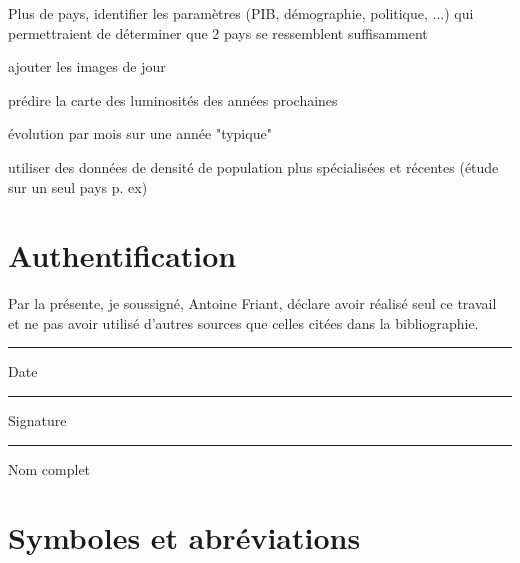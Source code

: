 \documentclass[a4paper, 11pt]{report}
\begin{document}
Plus de pays, identifier les paramètres (PIB, démographie, politique, ...) qui permettraient de déterminer que 2 pays se ressemblent suffisamment

ajouter les images de jour

prédire la carte des luminosités des années prochaines

évolution par mois sur une année "typique"

utiliser des données de densité de population plus spécialisées et récentes (étude sur un seul pays p. ex)

\printbibliography

\chapter{Authentification}
Par la présente, je soussigné, Antoine Friant, déclare avoir réalisé seul ce travail et ne pas avoir utilisé d'autres sources que celles citées dans la bibliographie.


\vspace*{5cm}


\begin{multicols}{2}
	
	\noindent\rule[0.5ex]{\linewidth}{1pt}
	Date
	
	\columnbreak
	
	\noindent\rule[0.5ex]{\linewidth}{1pt}
	Signature
	
	\vspace*{2cm}
	
	\noindent\rule[0.5ex]{\linewidth}{1pt}
	Nom complet
\end{multicols}

\chapter{Symboles et abréviations}

\listoffigures

\end{document}
